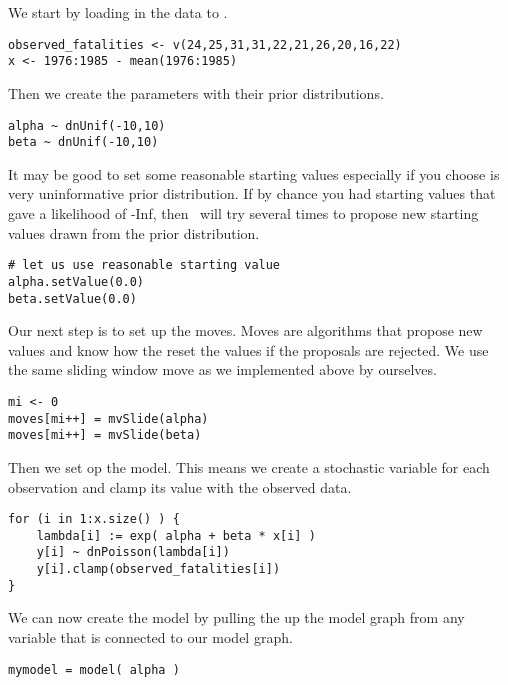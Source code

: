 We start by loading in the data to \RevBayes.
{\tt \begin{snugshade*}
\begin{lstlisting} 
observed_fatalities <- v(24,25,31,31,22,21,26,20,16,22)
x <- 1976:1985 - mean(1976:1985)
\end{lstlisting}
\end{snugshade*}}
Then we create the parameters with their prior distributions.
{\tt \begin{snugshade*}
\begin{lstlisting} 
alpha ~ dnUnif(-10,10) 
beta ~ dnUnif(-10,10)
\end{lstlisting}
\end{snugshade*}}
It may be good to set some reasonable starting values especially if you choose is very uninformative prior distribution.
If by chance you had starting values that gave a likelihood of -Inf, then \RevBayes~will try several times to propose new starting values drawn from the prior distribution.
{\tt \begin{snugshade*}
\begin{lstlisting} 
# let us use reasonable starting value
alpha.setValue(0.0)
beta.setValue(0.0)
\end{lstlisting}
\end{snugshade*}}
Our next step is to set up the moves.
Moves are algorithms that propose new values and know how the reset the values if the proposals are rejected.
We use the same sliding window move as we implemented above by ourselves.
{\tt \begin{snugshade*}
\begin{lstlisting} 
mi <- 0
moves[mi++] = mvSlide(alpha)
moves[mi++] = mvSlide(beta)
\end{lstlisting}
\end{snugshade*}}
Then we set op the model.
This means we create a stochastic variable for each observation and clamp its value with the observed data.
{\tt \begin{snugshade*}
\begin{lstlisting} 
for (i in 1:x.size() ) {
    lambda[i] := exp( alpha + beta * x[i] )
    y[i] ~ dnPoisson(lambda[i])
    y[i].clamp(observed_fatalities[i])
}
\end{lstlisting}
\end{snugshade*}}
We can now create the model by pulling the up the model graph from any variable that is connected to our model graph.
{\tt \begin{snugshade*}
\begin{lstlisting} 
mymodel = model( alpha )
\end{lstlisting}
\end{snugshade*}}
